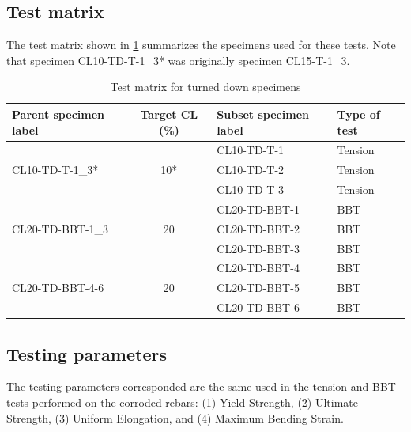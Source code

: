 \subsection{Test matrix}

The test matrix shown in \ref{tab:turned_down_matrix} summarizes the specimens used for these tests. Note that specimen CL10-TD-T-1\_3* was originally specimen CL15-T-1\_3.

\begin{table}[htbp]
\caption{Test matrix for turned down specimens}
\label{tab:turned_down_matrix}
\centering
\begin{tabular}{lcll}
Parent specimen label             & Target CL (\%)       & Subset specimen label & Type of test \\ \hline
\multirow{3}{*}{CL10-TD-T-1\_3*}  & \multirow{3}{*}{10*} & CL10-TD-T-1           & Tension      \\
                                  &                      & CL10-TD-T-2           & Tension      \\
                                  &                      & CL10-TD-T-3           & Tension      \\
\multirow{3}{*}{CL20-TD-BBT-1\_3} & \multirow{3}{*}{20}  & CL20-TD-BBT-1         & BBT          \\
                                  &                      & CL20-TD-BBT-2         & BBT          \\
                                  &                      & CL20-TD-BBT-3         & BBT          \\
\multirow{3}{*}{CL20-TD-BBT-4-6}  & \multirow{3}{*}{20}  & CL20-TD-BBT-4         & BBT          \\
                                  &                      & CL20-TD-BBT-5         & BBT          \\
                                  &                      & CL20-TD-BBT-6         & BBT         
\end{tabular}
\end{table}

\subsection{Testing parameters}
The testing parameters corresponded are the same used in the tension and BBT tests performed on the corroded rebars: (1) Yield Strength, (2) Ultimate Strength, (3) Uniform Elongation, and (4) Maximum Bending Strain.
